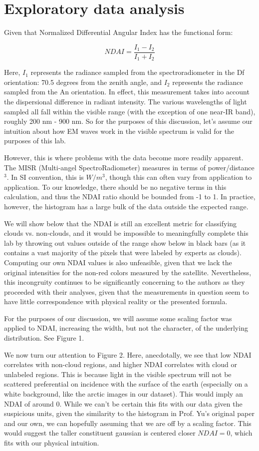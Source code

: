 \documentclass{article}\usepackage[]{graphicx}\usepackage[]{color}
\begin{document}
\section{Exploratory data analysis}

Given that Normalized Differential Angular Index has the functional form:

\[ NDAI = \frac{I_1 - I_2}{I_1 + I_2} \]

Here, \(I_1\) represents the radiance sampled from the spectroradiometer in the Df orientation: 70.5 degrees from the zenith angle, and \(I_2\) represents the radiance sampled from the An orientation.  In effect, this measurement takes into account the dispersional difference in radiant intensity.  The various wavelengths of light sampled all fall within the visible range (with the exception of one near-IR band), roughly 200 nm - 900 nm.  So for the purposes of this discussion, let’s assume our intuition about how EM waves work in the visible spectrum is valid for the purposes of this lab.

However, this is where problems with the data become more readily apparent.  The MISR (Multi-angel SpectroRadiometer) measures in terms of power/distance\(^3\).  In SI convention, this is \(W/m^3\), though this can often vary from application to application.  To our knowledge, there should be no negative terms in this calculation, and thus the NDAI ratio should be bounded from -1 to 1.  In practice, however, the histogram has a large bulk of the data outside the expected range.

We will show below that the NDAI is still an excellent metric for classifying clouds vs. non-clouds, and it would be impossible to meaningfully complete this lab by throwing out values outside of the range show below in black bars (as it contains a vast majority of the pixels that were labeled by experts as clouds).  Computing our own NDAI values is also unfeasible, given that we lack the original intensities for the non-red colors measured by the satellite.  Nevertheless, this incongruity continues to be significantly concerning to the authors as they proceeded with their analyses, given that the measurements in question seem to have little correspondence with physical reality or the presented formula.

For the purposes of our discussion, we will assume some scaling factor was applied to NDAI, increasing the width, but not the character, of the underlying distribution.  See Figure 1.

We now turn our attention to Figure 2.  Here, anecdotally, we see that low NDAI correlates with non-cloud regions, and higher NDAI correlates with cloud or unlabeled regions.  This is because light in the visible spectrum will not be scattered preferential on incidence with the surface of the earth (especially on a white background, like the arctic images in our dataset).  This would imply an NDAI of around 0.  While we can’t be certain this fits with our data given the suspicious units, given the similarity to the histogram in Prof. Yu’s original paper and our own, we can hopefully assuming that we are off by a scaling factor.  This would suggest the taller constituent gaussian is centered closer \(NDAI = 0\), which fits with our physical intuition.
\end{document}
